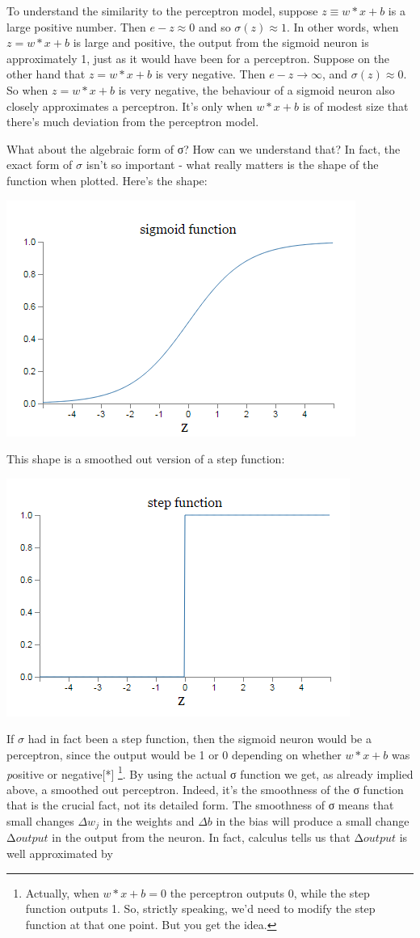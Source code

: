 \documentclass[a4paper,12pt]{report}%
\begin{document}
To understand the similarity to the perceptron model, suppose $ z \equiv w*x + b $ is a large positive number. Then $e-z \approx 0$ and so $\sigma(z) \approx 1$. In other words, when $z=w*x+b$ is large and positive, the output from the sigmoid neuron is approximately 1, just as it would have been for a perceptron. Suppose on the other hand that $z=w*x+b$ is very negative. Then $e-z \rightarrow \infty$, and $\sigma(z) \approx 0$. So when $z=w*x+b$ is very negative, the behaviour of a sigmoid neuron also closely approximates a perceptron. It's only when $w*x+b$ is of modest size that there's much deviation from the perceptron model.

What about the algebraic form of σ? How can we understand that? In fact, the exact form of $\sigma$ isn't so important - what really matters is the shape of the function when plotted. Here's the shape:

\begin{center}
 \includegraphics[width=0.5\linewidth]{images/sigmoid.png}
\end{center}

This shape is a smoothed out version of a step function:

\begin{center}
 \includegraphics[width=0.5\linewidth]{images/step.png}
\end{center}
If $\sigma$ had in fact been a step function, then the sigmoid neuron would be a perceptron, since the output would be 1 or 0 depending on whether $ w*x + b $ was {\emph positive or negative}[*] \footnote{\color{blue}Actually, when $w*x + b = 0 $ the perceptron outputs 0, while the step function outputs 1. So, strictly speaking, we'd need to modify the step function at that one point. But you get the idea.}. By using the actual σ function we get, as already implied above, a smoothed out perceptron. Indeed, it's the smoothness of the σ function that is the crucial fact, not its detailed form. The smoothness of σ means that small changes $Δw_{j}$ in the weights and $Δb$ in the bias will produce a small change Δ$output$ in the output from the neuron. In fact, calculus tells us that Δ$output$ is well approximated by
\end{document}
